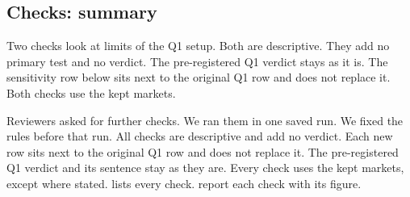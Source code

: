 \subsection{Checks: summary}\label{sec:res-checks}
Two checks look at limits of the Q1 setup.
Both are descriptive.
They add no primary test and no verdict.
The pre-registered Q1 verdict stays as it is.
The sensitivity row below sits next to the original Q1 row and does not replace it.
Both checks use the \QOneN{} kept markets.

Reviewers asked for further checks.
We ran them in one saved run.
We fixed the rules before that run.
All checks are descriptive and add no verdict.
Each new row sits next to the original Q1 row and does not replace it.
The pre-registered Q1 verdict and its sentence stay as they are.
Every check uses the \QOneN{} kept markets, except where stated.
 lists every check.
 report each check with its figure.

